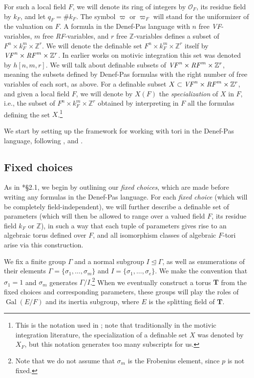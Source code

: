 \documentclass{amsart}
\newcommand{\Z}{{\mathbb Z}}
\newcommand{\ri}{\mathcal{O}}
\DeclareMathOperator{\gal}{Gal}
\newcommand{\bT}{\mathbf {T}}
\theoremstyle{plain}
\theoremstyle{definition}
\begin{document}
For such a local field $F$, we will denote its ring of integers by $\ri_F$, its residue field by $k_F$,
and let $q_F=\# k_F$. The symbol $\varpi$ or $\varpi_F$ will stand for the uniformizer of the valuation on $F$. 
A formula in the Denef-Pas language  with $n$ free \emph{VF}-variables, $m$ free \emph{RF}-variables, and $r$ free 
$\Z$-variables 
defines a subset of $F^n\times k_F^m \times \Z^r$. 
We will denote the definable set $F^n\times k_F^m \times \Z^r$ itself by
$\mbox{\emph{VF}}^n\times \mbox{\emph{RF}}^m\times \Z^r$.
In earlier works on motivic integration this set was denoted by $h[n,m,r]$. 
We will talk about definable subsets of $\mbox{\emph{VF}}^n\times \mbox{\emph{RF}}^m\times \Z^r$,
meaning the subsets defined by Denef-Pas formulas with the right number of free variables of each sort, as above. 
For a definable subset $X\subset \mbox{\emph{VF}}^n\times \mbox{\emph{RF}}^m\times \Z^r$, and given a local field $F$,  
we will denote by $X(F)$ the \emph{specialization} of $X$ in $F$, i.e., the subset of
$F^n\times k_F^m\times \Z^r$ obtained by interpreting in $F$ all the formulas defining the set $X$.\footnote{This
is the notation used in \cite{gordon-hales:15a}; note that traditionally in the motivic integration literature,
the {specialization} of a definable set $X$ was denoted by $X_F$, but this notation generates too many subscripts for us.} 

We start by setting up the framework for working with tori in the Denef-Pas language,
following \cite{cluckers-hales-loeser}, \cite{cluckers-gordon-halupczok:14b} and \cite{gordon-hales:15a}.



\subsection{Fixed choices}\label{sub:fixedchoices}

As in \cite{gordon-hales:15a}*{\S 2.1}, we begin by outlining our \emph{fixed choices},
which are made before writing any formulas in the Denef-Pas language.  
For each \emph{fixed choice} (which will be completely field-independent), we will further describe
a definable set of parameters (which will then be allowed to range over a valued field $F$,
its residue field $k_F$ or $\Z$), in such a way that each tuple of parameters gives rise to an algebraic torus
defined over $F$, and all isomorphism classes of algebraic $F$-tori arise via this construction.

We fix a finite group $\Gamma$ and a normal subgroup $I \unlhd \Gamma$,
as well as enumerations of their elements $\Gamma = \{\sigma_1, \dots, \sigma_m\}$ and
$I = \{\sigma_1, \dots, \sigma_e\}$.  We make the convention that $\sigma_1 = 1$ and $\sigma_m$
generates $\Gamma / I$.\footnote{Note that we do not assume that $\sigma_m$ is the Frobenius element, since $p$ is not fixed.}
When we eventually construct a torus $\bT$ from the fixed choices
and corresponding parameters, these groups will play the roles of $\gal(E/F)$
and its inertia subgroup, where $E$ is the splitting field of $\bT$.
\end{document}

